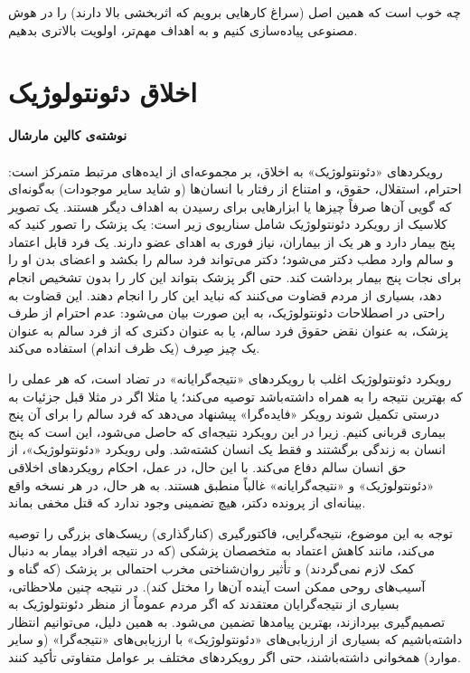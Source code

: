 چه خوب است که همین اصل (سراغ کارهایی برویم که اثربخشی بالا دارند) را در هوش مصنوعی پیاده‌سازی کنیم و به اهداف مهم‌تر، اولویت بالاتری بدهیم.
\newline

{
\section*{اخلاق دئونتولوژیک}
\label{sec:اخلاق دئونتولوژیک}
\textbf{نوشته‌ی کالین مارشال}
\\\\
رویکردهای «دئونتولوژیک» به اخلاق، بر مجموعه‌ای از ایده‌های مرتبط متمرکز است: احترام، استقلال، حقوق، و امتناع از رفتار با انسان‌ها (و شاید سایر موجودات) به‌گونه‌ای که گویی آن‌ها صرفاً چیزها یا ابزارهایی برای رسیدن به اهداف دیگر هستند.
یک تصویر کلاسیک از رویکرد دئونتولوژیک شامل سناریوی زیر است: یک پزشک را تصور کنید که پنج بیمار دارد و هر یک از بیماران، نیاز فوری به اهدای عضو دارند.
یک فرد قابل اعتماد و سالم وارد مطب دکتر می‌شود؛ دکتر می‌تواند فرد سالم را بکشد و اعضای بدن او را برای نجات پنج بیمار برداشت کند.
حتی اگر پزشک بتواند این کار را بدون تشخیص انجام دهد، بسیاری از مردم قضاوت می‌کنند که نباید این کار را انجام دهند.
این قضاوت به راحتی در اصطلاحات دئونتولوژیک، به این صورت بیان می‌شود: عدم احترام از طرف پزشک، به عنوان نقض حقوق فرد سالم، یا به عنوان دکتری که از فرد سالم به عنوان یک چیز صِرف (یک ظرف اندام) استفاده می‌کند.
}

رویکرد دئونتولوژیک اغلب با رویکردهای «نتیجه‌گرایانه» در تضاد است، که هر عملی را که بهترین نتیجه را به همراه داشته‌باشد توصیه می‌کند؛ یا مثلا اگر در مثلا قبل جزئیات به درستی تکمیل شوند رویکر «فایده‌گرا» پیشنهاد می‌دهد که فرد سالم را برای آن پنج بیماری قربانی کنیم.
زیرا در این رویکرد نتیجه‌ای که حاصل می‌شود، این است که پنج انسان به زندگی برگشتند و فقط یک انسان کشته‌شد.
ولی رویکرد «دئونتولوژیک»، از حق انسان سالم دفاع می‌کند.
با این حال، در عمل، احکام رویکردهای اخلاقی «دئونتولوژیک» و «نتیجه‌گرایانه» غالباً منطبق هستند.
به هر حال، در هر نسخه واقع بینانه‌ای از پرونده دکتر، هیچ تضمینی وجود ندارد که قتل مخفی بماند.

توجه به این موضوع، نتیجه‌گرایی، فاکتورگیری (کنارگذاری) ریسک‌های بزرگی را توصیه می‌کند، مانند کاهش اعتماد به متخصصان پزشکی (که در نتیجه افراد بیمار به دنبال کمک لازم نمی‌گردند) و تأثیر روان‌شناختی مخرب احتمالی بر پزشک (که گناه و آسیب‌های روحی ممکن است آینده آن‌ها را مختل کند).
در نتیجه چنین ملاحظاتی، بسیاری از نتیجه‌گرایان معتقدند که اگر مردم عموماً از منظر دئونتولوژیک به تصمیم‌گیری بپردازند، بهترین پیامدها تضمین می‌شود.
به همین دلیل، می‌توانیم انتظار داشته‌باشیم که بسیاری از ارزیابی‌های «دئونتولوژیک» با ارزیابی‌های «نتیجه‌گرا» (و سایر موارد) همخوانی داشته‌باشند، حتی اگر رویکردهای مختلف بر عوامل متفاوتی تأکید کنند.

